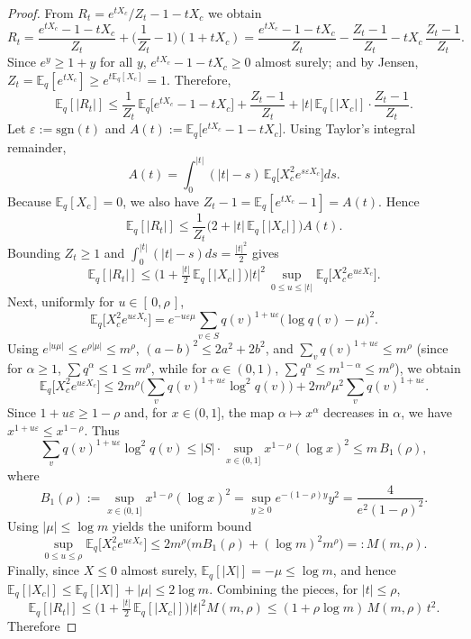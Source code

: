 \begin{proof}
From $R_t=e^{tX_c}/Z_t-1-tX_c$ we obtain
\[
R_t=\frac{e^{tX_c}-1-tX_c}{Z_t}+\Big(\frac{1}{Z_t}-1\Big)(1+tX_c)
=\frac{e^{tX_c}-1-tX_c}{Z_t}-\frac{Z_t-1}{Z_t}-tX_c\,\frac{Z_t-1}{Z_t}.
\]
Since $e^y\ge 1+y$ for all $y$, $e^{tX_c}-1-tX_c\ge0$ almost surely; and by Jensen, $Z_t=\mathbb{E}_q[e^{tX_c}]\ge e^{t\mathbb{E}_q[X_c]}=1$. Therefore,
\[
\mathbb{E}_q[|R_t|]\le \frac{1}{Z_t}\,\mathbb{E}_q\big[e^{tX_c}-1-tX_c\big]+\frac{Z_t-1}{Z_t}+|t|\,\mathbb{E}_q[|X_c|] \cdot \frac{Z_t-1}{Z_t}.
\]
Let $\varepsilon:=\mathrm{sgn}(t)$ and $A(t):=\mathbb{E}_q\big[e^{tX_c}-1-tX_c\big]$. Using Taylor's integral remainder,
\[
A(t)=\int_0^{|t|}(|t|-s)\,\mathbb{E}_q\big[X_c^2 e^{s\varepsilon X_c}\big]ds.
\]
Because $\mathbb{E}_q[X_c]=0$, we also have $Z_t-1=\mathbb{E}_q[e^{tX_c}-1]=A(t)$. Hence
\[
\mathbb{E}_q[|R_t|]\le \frac{1}{Z_t}\big(2+|t|\,\mathbb{E}_q[|X_c|]\big)A(t).
\]
Bounding $Z_t\ge1$ and $\int_0^{|t|}(|t|-s)ds=\tfrac{|t|^2}{2}$ gives
\[
\mathbb{E}_q[|R_t|]\le \Big(1+\tfrac{|t|}{2}\,\mathbb{E}_q[|X_c|]\Big)|t|^2\,\sup_{0\le u\le |t|}\mathbb{E}_q\big[X_c^2 e^{u\varepsilon X_c}\big].
\]
Next, uniformly for $u\in[\,0,\rho\,]$,
\[
\mathbb{E}_q\big[X_c^2 e^{u\varepsilon X_c}\big]=e^{-u\varepsilon\mu}\sum_{v\in S} q(v)^{1+u\varepsilon}\big(\log q(v)-\mu\big)^2.
\]
Using $e^{|u\mu|}\le e^{\rho|\mu|}\le m^{\rho}$, $(a-b)^2\le2a^2+2b^2$, and $\sum_v q(v)^{1+u\varepsilon}\le m^{\rho}$ (since for $\alpha\ge1$, $\sum q^\alpha\le1\le m^{\rho}$, while for $\alpha\in(0,1)$, $\sum q^\alpha\le m^{1-\alpha}\le m^{\rho}$), we obtain
\[
\mathbb{E}_q\big[X_c^2 e^{u\varepsilon X_c}\big]\le 2 m^{\rho}\Big(\sum_{v} q(v)^{1+u\varepsilon}\log^2 q(v)\Big)+2 m^{\rho}\mu^2\!\sum_{v} q(v)^{1+u\varepsilon}.
\]
Since $1+u\varepsilon\ge 1-\rho$ and, for $x\in(0,1]$, the map $\alpha\mapsto x^\alpha$ decreases in $\alpha$, we have $x^{1+u\varepsilon}\le x^{1-\rho}$. Thus
\[
\sum_{v} q(v)^{1+u\varepsilon}\log^2 q(v)\le |S|\cdot \sup_{x\in(0,1]} x^{1-\rho}(\log x)^2\le m\,B_1(\rho),
\]
where
\[
B_1(\rho):=\sup_{x\in(0,1]} x^{1-\rho}(\log x)^2=\sup_{y\ge0} e^{-(1-\rho)y}y^2=\frac{4}{e^2(1-\rho)^2}.
\]
Using $|\mu|\le\log m$ yields the uniform bound
\[
\sup_{0\le u\le\rho}\mathbb{E}_q\big[X_c^2 e^{u\varepsilon X_c}\big]\le 2 m^{\rho}\big(m B_1(\rho)+ (\log m)^2 m^{\rho}\big)=:M(m,\rho).
\]
Finally, since $X\le0$ almost surely, $\mathbb{E}_q[|X|]=-\mu\le\log m$, and hence $\mathbb{E}_q[|X_c|]\le \mathbb{E}_q[|X|]+|\mu|\le 2\log m$. Combining the pieces, for $|t|\le\rho$,
\[
\mathbb{E}_q[|R_t|]\le \Big(1+\tfrac{|t|}{2}\,\mathbb{E}_q[|X_c|]\Big)|t|^2 M(m,\rho)\le (1+\rho\log m)\,M(m,\rho)\,t^2.
\]
Therefore

\end{proof}
